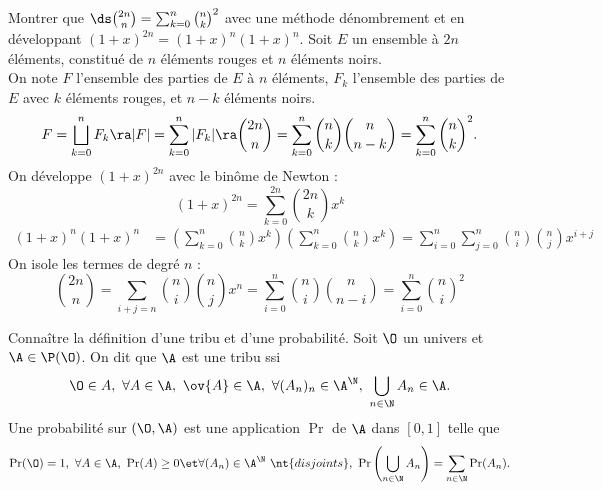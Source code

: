 \documentclass[french, 11pt]{article}
\begin{document}


\begin{question}{}{}
    Montrer que $\ds\binom{2n}{n}=\sum_{k=0}^n\binom{n}{k}^2$ avec une méthode dénombrement et en développant $(1+x)^{2n}=(1+x)^n(1+x)^n$.
    \tcblower
    Soit $E$ un ensemble à $2n$ éléments, constitué de $n$ éléments rouges et $n$ éléments noirs.\\
    On note $F$ l'ensemble des parties de $E$ à $n$ éléments, $F_k$ l'ensemble des parties de $E$ avec $k$ éléments rouges, et $n-k$ éléments noirs.
    \begin{equation*}
        F = \bigsqcup_{k=0}^n F_k \ra |F| = \sum_{k=0}^n |F_k| \ra \binom{2n}{n} = \sum_{k=0}^n \binom{n}{k}\binom{n}{n-k} = \sum_{k=0}^n\binom{n}{k}^2.
    \end{equation*}
    On développe $(1+x)^{2n}$ avec le binôme de Newton :
    \begin{equation*}
        (1+x)^{2n} = \sum_{k=0}^{2n} \binom{2n}{k} x^k
    \end{equation*}
    \begin{align*}
        (1+x)^n(1+x)^n &= \left(\sum_{k=0}^n \binom{n}{k}x^k\right)\left(\sum_{k=0}^n\binom{n}{k}x^k\right) = \sum_{i=0}^n\sum_{j=0}^n \binom{n}{i}\binom{n}{j}x^{i+j}
    \end{align*}
    On isole les termes de degré $n$ : 
    \begin{equation*} \binom{2n}{n}=\sum_{i+j=n}\binom{n}{i}\binom{n}{j}x^n = \sum_{i=0}^n\binom{n}{i}\binom{n}{n-i} = \sum_{i=0}^n\binom{n}{i}^2 \end{equation*}
\end{question}

\begin{question}{}{}
    Connaître la définition d'une tribu et d'une probabilité.
    \tcblower
    Soit $\O$ un univers et $\A\in\P(\O)$. On dit que $\A$ est une tribu ssi
    \begin{equation*}
        \O \in A, ~ \forall A \in \A, ~ \ov{A} \in \A, ~ \forall (A_n)_n\in\A^\N, ~ \bigcup_{n\in\N}A_n \in \A.
    \end{equation*}
    Une probabilité sur $(\O,\A)$ est une application $\Pr$ de $\A$ dans $[0,1]$ telle que
    \begin{equation*}
        \Pr(\O) = 1, ~ \forall A \in \A, ~ \Pr(A)\geq0 \et \forall (A_n)\in\A^\N ~ \nt{disjoints}, ~ \Pr\left(\bigcup_{n\in\N}A_n\right) = \sum_{n\in\N}\Pr(A_n).
    \end{equation*}
\end{question}
\end{document}
